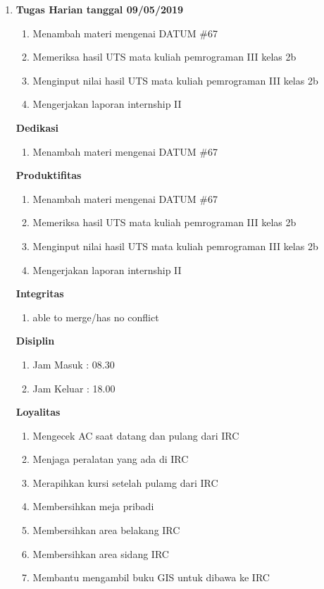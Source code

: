 \begin{enumerate}
\item \textbf{Tugas Harian tanggal 09/05/2019}
\begin{enumerate}
\item Menambah materi mengenai DATUM \#67
\item Memeriksa hasil UTS mata kuliah pemrograman III kelas 2b
\item Menginput nilai hasil UTS mata kuliah pemrograman III kelas 2b
\item Mengerjakan laporan internship II
\end{enumerate}

\textbf{Dedikasi}
\begin{enumerate}
\item Menambah materi mengenai DATUM \#67
\end{enumerate}

\textbf{Produktifitas}
\begin{enumerate}
\item Menambah materi mengenai DATUM \#67
\item Memeriksa hasil UTS mata kuliah pemrograman III kelas 2b
\item Menginput nilai hasil UTS mata kuliah pemrograman III kelas 2b
\item Mengerjakan laporan internship II
\end{enumerate}

\textbf{Integritas}
\begin{enumerate}
\item able to merge/has no conflict
\end{enumerate}

\textbf{Disiplin}
\begin{enumerate}
\item Jam Masuk : 08.30
\item Jam Keluar : 18.00
\end{enumerate}

\textbf{Loyalitas}
\begin{enumerate}
\item Mengecek AC saat datang dan pulang dari IRC
\item Menjaga peralatan yang ada di IRC
\item Merapihkan kursi setelah pulamg dari IRC
\item Membersihkan meja pribadi
\item Membersihkan area belakang IRC
\item Membersihkan area sidang IRC
\item Membantu mengambil buku GIS untuk dibawa ke IRC
\end{enumerate}
\end{enumerate}


